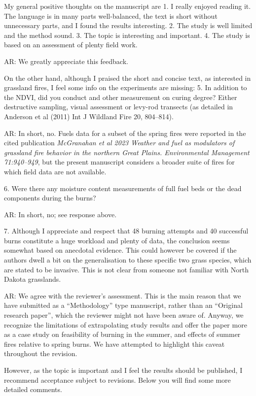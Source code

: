 \documentclass[parskip=half, american]{scrartcl}
\newcommand{\AR}[1]
	{\color{PineGreen}AR: #1\color{black} \par }
\begin{document}
My general positive thoughts on the manuscript are
1.	I really enjoyed reading it. The language is in many parts well-balanced, the text is short without unnecessary parts, and I found the results interesting.
2.	The study is well limited and the method sound.
3.	The topic is interesting and important.
4.	The study is based on an assessment of plenty field work. 

\AR{ We greatly appreciate this feedback. }

On the other hand, although I praised the short and concise text, as interested in grassland fires, I feel some info on the experiments are missing:
5.	In addition to the NDVI, did you conduct and other measurement on curing degree? Either destructive sampling, visual assessment or levy-rod transects (as detailed in Anderson et al (2011) Int J Wildland Fire 20, 804–814). 

\AR{In short, no. Fuels data for a subset of the spring fires were reported in the cited publication \emph{McGranahan et al 2023 Weather and fuel as modulators of grassland fire behavior in the northern Great Plains. Environmental Management 71:940–949}, but the present manuscript considers a broader suite of fires for which field data are not available.   }

6.	Were there any moisture content measurements of full fuel beds or the dead components during the burns?

\AR{In short, no; see response above. }

7.	Although I appreciate and respect that 48 burning attempts and 40 successful burns constitute a huge workload and plenty of data, the conclusion seems somewhat based on anecdotal evidence. This could however be covered if the authors dwell a bit on the generalisation to these specific two grass species, which are stated to be invasive. This is not clear from someone not familiar with North Dakota grasslands.  

\AR{We agree with the reviewer's assessment. 
This is the main reason that we have submitted as a ``Methodology'' type manuscript, rather than an ``Original research paper'', which the reviewer might not have been aware of. 
Anyway, we recognize the limitations of extrapolating study results and offer the paper more as a case study on feasibility of burning in the summer, and effects of summer fires relative to spring burns. 
We have attempted to highlight this caveat throughout the revision.   }

However, as the topic is important and I feel the results should be published, I recommend acceptance subject to revisions. Below you will find some more detailed comments.
\end{document}
